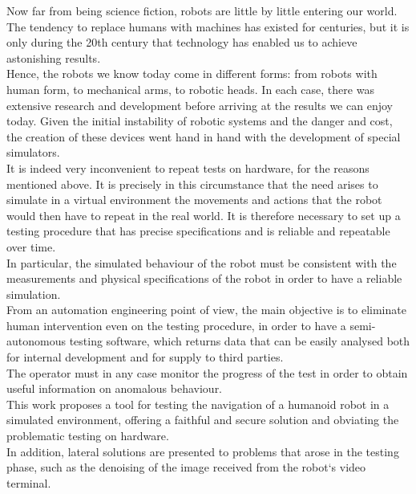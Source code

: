 Now far from being science fiction, robots are little by little entering our world. The tendency to replace humans with machines has existed for centuries, but it is only during the 20th century that technology has enabled us to achieve astonishing results.\\
Hence, the robots we know today come in different forms: from robots with human form, to mechanical arms, to robotic heads. 
In each case, there was extensive research and development before arriving at the results we can enjoy today.
Given the initial instability of robotic systems and the danger and cost, the creation of these devices went hand in hand with the development of special simulators. \\
It is indeed very inconvenient to repeat tests on hardware, for the reasons mentioned above. It is precisely in this circumstance that the need arises to simulate in a virtual environment the movements and actions that the robot would then have to repeat in the real world.
It is therefore necessary to set up a testing procedure that has precise specifications and is reliable and repeatable over time. \\
In particular, the simulated behaviour of the robot must be consistent with the measurements and physical specifications of the robot in order to have a reliable simulation.\\
From an automation engineering point of view, the main objective is to eliminate human intervention even on the testing procedure, in order to have a semi-autonomous testing software, which returns data that can be easily analysed both for internal development and for supply to third parties.\\
The operator must in any case monitor the progress of the test in order to obtain useful information on anomalous behaviour. \\

This work proposes a tool for testing the navigation of a humanoid robot in a simulated environment, offering a faithful and secure solution and obviating the problematic testing on hardware.\\

In addition, lateral solutions are presented to problems that arose in the testing phase, such as the denoising of the image received from the robot`s video terminal.\\

